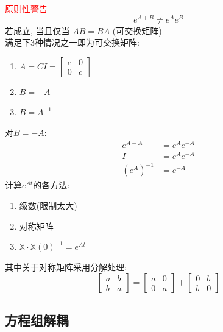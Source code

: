 \textcolor{red}{原则性警告}
\[ e^{A+B} \neq e^{A} e^{B} \]
若成立, 当且仅当 $AB = BA$ (可交换矩阵) \\
满足下3种情况之一即为可交换矩阵:
\begin{enumerate}
    \item $A = C I =
\begin{bmatrix}
    c & 0 \\
    0 & c
\end{bmatrix}$
    \item $B=-A$
    \item $B=A^{-1}$
\end{enumerate}
对$B=-A$:
\begin{align*}
    e^{A-A} &= e^A e^{-A}\\
    I &= e^A e^{-A} \\
    (e^A)^{-1} &= e^{-A}
\end{align*}
\newpage
计算$e^{At}$的各方法:
\begin{enumerate}
    \item 级数(限制太大)
    \item 对称矩阵
    \item $\mathbb{X} \cdot \mathbb{X}(0)^{-1} = e^{At}$
\end{enumerate}
其中关于对称矩阵采用分解处理:
\[
\begin{bmatrix}
    a & b \\
    b & a
\end{bmatrix} = 
\begin{bmatrix}
    a & 0 \\
    0 & a
\end{bmatrix} +
\begin{bmatrix}
    0 & b \\
    b & 0
\end{bmatrix}
\]


\subsection{\LARGE \hspace*{0.1em}方程组解耦}
